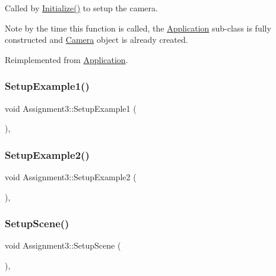 Called by \hyperlink{class_application_a17cf1ea4552d26a1c20f7d98d793d41d}{Initialize()} to setup the camera.

Note by the time this function is called, the \hyperlink{class_application}{Application} sub-\/class is fully constructed and \hyperlink{class_camera}{Camera} object is already created.

Reimplemented from \hyperlink{class_application_a2eb61ca027f223a5c5ad1bf982481193}{Application}.

\hypertarget{class_assignment3_a468c30083d6f75d99cd1fe41205983dc}{}\label{class_assignment3_a468c30083d6f75d99cd1fe41205983dc}
\subsubsection{\texorpdfstring{Setup\+Example1()}{SetupExample1()}}
{\footnotesize\ttfamily void Assignment3\+::\+Setup\+Example1 (\begin{DoxyParamCaption}{ }\end{DoxyParamCaption})\hspace{0.3cm}{\ttfamily [private]}, {\ttfamily [virtual]}}

\hypertarget{class_assignment3_af6d27b156c0781ff6aba450bd78b61ff}{}\label{class_assignment3_af6d27b156c0781ff6aba450bd78b61ff}
\subsubsection{\texorpdfstring{Setup\+Example2()}{SetupExample2()}}
{\footnotesize\ttfamily void Assignment3\+::\+Setup\+Example2 (\begin{DoxyParamCaption}{ }\end{DoxyParamCaption})\hspace{0.3cm}{\ttfamily [private]}, {\ttfamily [virtual]}}

\hypertarget{class_assignment3_a2dc29d9016a9d822ede84b9ef41429a5}{}\label{class_assignment3_a2dc29d9016a9d822ede84b9ef41429a5}
\subsubsection{\texorpdfstring{Setup\+Scene()}{SetupScene()}}
{\footnotesize\ttfamily void Assignment3\+::\+Setup\+Scene (\begin{DoxyParamCaption}{ }\end{DoxyParamCaption})\hspace{0.3cm}{\ttfamily [private]}, {\ttfamily [virtual]}}



